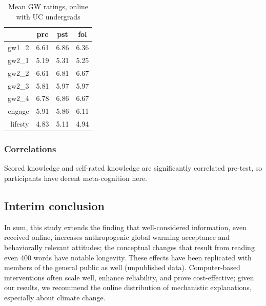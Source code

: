 \begin{table}[h]
\caption{Mean GW ratings, online with UC undergrads} 
\label{table:uc-online-gw-means}
\centering
\begin{tabular}{rccc}
  \toprule
 & pre & pst & fol \\ 
  \midrule
  gw1\_2 & 6.61 & 6.86 & 6.36 \\ 
  gw2\_1 & 5.19 & 5.31 & 5.25 \\ 
  gw2\_2 & 6.61 & 6.81 & 6.67 \\ 
  gw2\_3 & 5.81 & 5.97 & 5.97 \\ 
  gw2\_4 & 6.78 & 6.86 & 6.67 \\ 
  engage & 5.91 & 5.86 & 6.11 \\ 
  lifesty & 4.83 & 5.11 & 4.94 \\ 
  \bottomrule
\end{tabular}
\end{table}



\subsubsection{Correlations}

Scored knowledge and self-rated knowledge are significantly correlated pre-test,
so participants have decent meta-cognition here.

\subsection{Interim conclusion}

In sum, this study extends the finding that well-considered information, even
received online, increases anthropogenic global warming acceptance and
behaviorally relevant attitudes; the conceptual changes that result from reading
even 400 words have notable longevity. These effects have been replicated with
members of the general public as well (unpublished data). Computer-based
interventions often scale well, enhance reliability, and prove cost-effective;
given our results, we recommend the online distribution of mechanistic
explanations, especially about climate change.  

